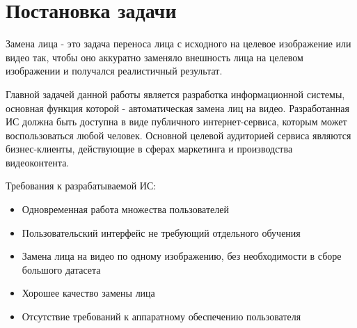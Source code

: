 \section{Постановка задачи}

Замена лица - это задача переноса лица с исходного на целевое изображение или видео так, чтобы оно аккуратно заменяло внешность лица на целевом изображении и получался реалистичный результат\cite[стр. 1]{nirkin2019fsgan}.

Главной задачей данной работы является разработка информационной системы, основная функция которой - автоматическая замена лиц на видео. Разработанная ИС должна быть доступна в виде публичного интернет-сервиса, которым может воспользоваться любой человек.
Основной целевой аудиторией сервиса являются бизнес-клиенты, действующие в сферах маркетинга и производства видеоконтента.

Требования к разрабатываемой ИС:

\begin{itemize}
    \item Одновременная работа множества пользователей
    \item Пользовательский интерфейс не требующий отдельного обучения
    \item Замена лица на видео по одному изображению, без необходимости в сборе большого датасета
    \item Хорошее качество замены лица
    \item Отсутствие требований к аппаратному обеспечению пользователя
\end{itemize}